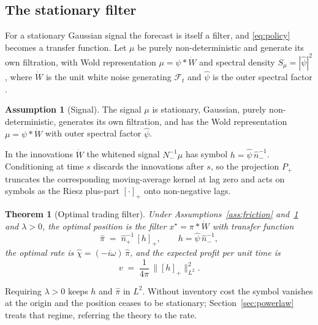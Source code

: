 \documentclass[11pt]{article}
\newcommand{\F}{\mathcal{F}}
\newcommand{\pluspart}[1]{\left[#1\right]_+}
\theoremstyle{plain}
\newtheorem{theorem}{Theorem}
\theoremstyle{definition}
\newtheorem{assumption}{Assumption}
\theoremstyle{remark}
\begin{document}
\subsection{The stationary filter}\label{sec:filter}

For a stationary Gaussian signal the forecast is itself a filter, and \eqref{eq:policy} becomes a transfer function. Let $\mu$ be purely non-deterministic and generate its own filtration, with Wold representation $\mu=\psi\ast\dot W$ and spectral density $S_\mu=|\hat\psi|^2$, where $\dot W$ is the unit white noise generating $\F_t$ and $\hat\psi$ is the outer spectral factor \citep{Wiener1949,Whittle1963}.

\begin{assumption}[Signal]\label{ass:signal}
The signal $\mu$ is stationary, Gaussian, purely non-deterministic, generates its own filtration, and has the Wold representation $\mu=\psi\ast\dot W$ with outer spectral factor $\hat\psi$.
\end{assumption}

In the innovations $\dot W$ the whitened signal $N_-^{-1}\mu$ has symbol $h=\hat\psi\,\hat n_-^{-1}$. Conditioning at time $s$ discards the innovations after $s$, so the projection $P_+$ truncates the corresponding moving-average kernel at lag zero and acts on symbols as the Riesz plus-part $\pluspart{\cdot}$ onto non-negative lags.

\begin{theorem}[Optimal trading filter]\label{thm:filter}
Under Assumptions~\ref{ass:friction} and~\ref{ass:signal} and $\lambda>0$, the optimal position is the filter $x^\star=\pi\ast\dot W$ with transfer function
\begin{equation}\label{eq:filter}
\hat\pi \;=\; \hat n_+^{-1}\,\pluspart{h}, \qquad h=\hat\psi\,\hat n_-^{-1},
\end{equation}
the optimal rate is $\hat\chi=(-i\omega)\,\hat\pi$, and the expected profit per unit time is
\begin{equation}\label{eq:value}
v \;=\; \frac{1}{4\pi}\,\bigl\|\pluspart{h}\bigr\|_{L^2}^2 .
\end{equation}
\end{theorem}

Requiring $\lambda>0$ keeps $h$ and $\hat\pi$ in $L^2$. Without inventory cost the symbol vanishes at the origin and the position ceases to be stationary; Section~\ref{sec:powerlaw} treats that regime, referring the theory to the rate.
\end{document}
